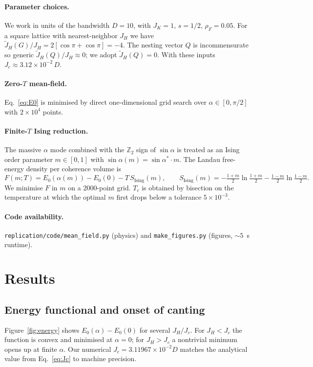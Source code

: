 \documentclass[11pt]{article}
\begin{document}
\paragraph{Parameter choices.} We work in units of the bandwidth $D=10$, with
$J_K=1$, $s=1/2$, $\rho_F=0.05$. For a square lattice with nearest-neighbor $J_H$
we have $\tilde{J}_H(G)/J_H = 2[\cos\pi+\cos\pi]=-4$. The nesting vector $Q$ is
incommensurate so generic $\tilde{J}_H(Q)/J_H\approx 0$; we adopt
$\tilde{J}_H(Q)=0$. With these inputs $J_c \approx 3.12\times10^{-2}\,D$.

\paragraph{Zero-$T$ mean-field.} Eq.~\eqref{eq:E0} is minimised by direct
one-dimensional grid search over $\alpha\in[0,\pi/2]$ with $2\times10^4$ points.

\paragraph{Finite-$T$ Ising reduction.} The massive $\alpha$ mode combined with
the $\mathbb{Z}_2$ sign of $\sin\alpha$ is treated as an Ising order parameter
$m\in[0,1]$ with $\sin\alpha(m) = \sin\alpha^*\cdot m$. The Landau free-energy
density per coherence volume is
\[
  F(m;T) = E_0(\alpha(m)) - E_0(0) - T\,S_{\text{Ising}}(m),
  \qquad
  S_{\text{Ising}}(m)=-\tfrac{1+m}{2}\ln\tfrac{1+m}{2}-\tfrac{1-m}{2}\ln\tfrac{1-m}{2}.
\]
We minimise $F$ in $m$ on a $2000$-point grid. $T_c$ is obtained by bisection on
the temperature at which the optimal $m$ first drops below a tolerance
$5\times10^{-3}$.

\paragraph{Code availability.}
\texttt{replication/code/mean\_field.py} (physics) and \texttt{make\_figures.py}
(figures, $\sim\!5$~s runtime).

\section{Results}

\subsection{Energy functional and onset of canting}

Figure~\ref{fig:energy} shows $E_0(\alpha)-E_0(0)$ for several $J_H/J_c$.
For $J_H<J_c$ the function is convex and minimised at $\alpha=0$; for
$J_H>J_c$ a nontrivial minimum opens up at finite $\alpha$. Our numerical
$J_c = 3.11967\times10^{-2}D$ matches the analytical value from
Eq.~\eqref{eq:Jc} to machine precision.
\end{document}
